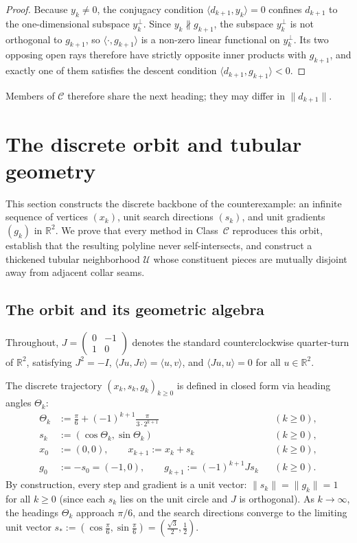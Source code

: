 \documentclass[11pt]{article}
\newcommand{\R}{\mathbb{R}}
\newcommand{\ip}[2]{\langle #1,#2\rangle}
\begin{document}
\begin{proof}
Because $y_k \ne 0$, the conjugacy condition $\ip{d_{k+1}}{y_k}=0$ confines $d_{k+1}$ to the one-dimensional subspace $y_k^\perp$.
Since $y_k \not\parallel g_{k+1}$, the subspace $y_k^\perp$ is not orthogonal to $g_{k+1}$, so $\ip{\cdot}{g_{k+1}}$ is a non-zero linear functional on $y_k^\perp$.
Its two opposing open rays therefore have strictly opposite inner products with $g_{k+1}$, and exactly one of them satisfies the descent condition $\ip{d_{k+1}}{g_{k+1}}<0$.
\end{proof}

Members of $\mathcal C$ therefore share the next heading; they may
differ in $\|d_{k+1}\|$.

\section{The discrete orbit and tubular geometry}
\label{sec:orbit}

This section constructs the discrete backbone of the counterexample: an infinite sequence of vertices $(x_k)$, unit search directions $(s_k)$, and unit gradients $(g_k)$ in $\R^2$.
We prove that every method in Class~$\mathcal C$ reproduces this orbit, establish that the resulting polyline never self-intersects, and construct a thickened tubular neighborhood $\mathcal U$ whose constituent pieces are mutually disjoint away from adjacent collar seams.

\subsection{The orbit and its geometric algebra}

Throughout, $J = \begin{pmatrix} 0 & -1 \\ 1 & 0 \end{pmatrix}$ denotes the standard counterclockwise quarter-turn of $\R^2$, satisfying $J^2 = -I$, $\ip{Ju}{Jv} = \ip{u}{v}$, and $\ip{Ju}{u} = 0$ for all $u \in \R^2$.

The discrete trajectory $(x_k, s_k, g_k)_{k \ge 0}$ is defined in closed form via heading angles $\Theta_k$:
\begin{equation}
\label{eq:orbit}
\begin{aligned}
\Theta_k &:= \frac{\pi}{6} + (-1)^{k+1}\frac{\pi}{3 \cdot 2^{k+1}} && (k \ge 0),\\
s_k &:= (\cos\Theta_k, \sin\Theta_k) && (k \ge 0),\\
x_0 &:= (0, 0), \qquad x_{k+1} := x_k + s_k && (k \ge 0),\\
g_0 &:= -s_0 = (-1, 0), \qquad g_{k+1} := (-1)^{k+1} J s_k && (k \ge 0).
\end{aligned}
\end{equation}
By construction, every step and gradient is a unit vector: $\|s_k\| = \|g_k\| = 1$ for all $k \ge 0$ (since each $s_k$ lies on the unit circle and $J$ is orthogonal).
As $k \to \infty$, the headings $\Theta_k$ approach $\pi/6$, and the search directions converge to the limiting unit vector $s_* := (\cos\frac{\pi}{6}, \sin\frac{\pi}{6}) = (\frac{\sqrt3}{2}, \frac12)$.
\end{document}
